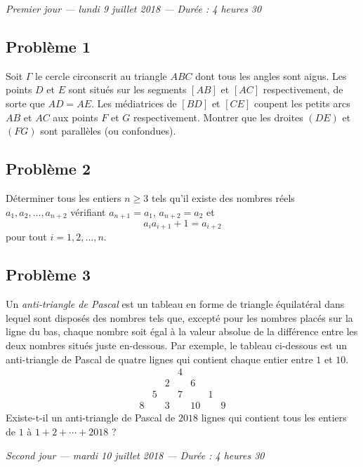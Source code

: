 
\begin{center}
  \emph{Premier jour --- lundi 9 juillet 2018 --- Durée : 4 heures 30}
\end{center}

\subsection*{Problème 1}
Soit $\Gamma$ le cercle circonscrit au triangle $ABC$ dont tous les angles sont aigus. Les points $D$ et $E$
sont situés sur les segments $[AB]$ et $[AC]$ respectivement, de sorte que $AD = AE$. Les médiatrices de $[BD]$
et $[CE]$ coupent les petits arcs $AB$ et $AC$ aux points $F$ et $G$ respectivement. Montrer que les droites
$(DE)$ et $(FG)$ sont parallèles (ou confondues).

\subsection*{Problème 2}
Déterminer tous les entiers $n \geqslant 3$ tels qu'il existe des nombres réels $a_1, a_2, \ldots, a_{n+2}$
vérifiant $a_{n+1} = a_1$, $a_{n+2} = a_2$ et
\[
a_ia_{i+1} + 1 = a_{i+2}
\]
pour tout $i = 1, 2, \ldots, n$.

\subsection*{Problème 3}
Un \emph{anti-triangle de Pascal} est un tableau en forme de triangle équilatéral dans lequel sont disposés des
nombres tels que, excepté pour les nombres placés sur la ligne du bas, chaque nombre soit égal à la valeur
absolue de la différence entre les deux nombres situés juste en-dessous. Par exemple, le tableau ci-dessous est
un anti-triangle de Pascal de quatre lignes qui contient chaque entier entre $1$ et $10$.
\[
\begin{array}{ccccccc}
 & & & 4 & & & \\
 & & 2 & & 6 & & \\
 & 5 & & 7 & & 1 & \\
8 & & 3 & & 10 & & 9
\end{array}
\]
Existe-t-il un anti-triangle de Pascal de $2018$ lignes qui contient tous les entiers de $1$ à
$1 + 2 + \cdots + 2018$ ?

\bigskip
\begin{center}
  \emph{Second jour --- mardi 10 juillet 2018 --- Durée : 4 heures 30}
\end{center}

